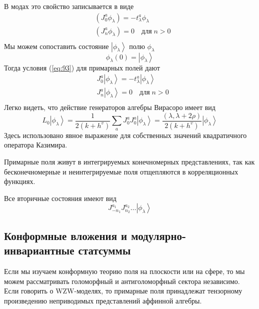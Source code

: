 \documentclass[a4paper,12pt]{article}
\theoremstyle{definition} \newtheorem{Def}{Definition}
\begin{document}
В модах это свойство записывается в виде
\begin{equation}
  \label{eq:93}
  \begin{aligned}
    & (J_0^a \phi_{\lambda})=-t^a_{\lambda}\phi_{\lambda}\\
    & (J^a_n\phi_{\lambda})=0\quad \mbox{для}\; n>0\\
  \end{aligned}
\end{equation}
Мы можем сопоставить состояние $\left|\phi_{\lambda}\right>$ полю $\phi_{\lambda}$
  \begin{equation}
    \label{eq:94}
    \phi_{\lambda}(0)=\left|\phi_{\lambda}\right>
  \end{equation}
Тогда условия (\ref{eq:93}) для примарных полей дают
\begin{equation}
  \label{eq:95}
  \begin{aligned}
    & J_0^a\left|\phi_{\lambda}\right>=-t^a_{\lambda}\left|\phi_{\lambda}\right>\\
    & J^a_n\left|\phi_{\lambda}\right>=0 \quad \mbox{для}\; n>0 \\
  \end{aligned}
\end{equation}
Легко видеть, что действие генераторов алгебры Вирасоро имеет вид
\begin{equation}
  \label{eq:96}
  L_0\left|\phi_{\lambda}\right>=\frac{1}{2(k+h^v)}\sum_aJ^a_0J^a_0\left|\phi_{\lambda}\right>=\frac{(\lambda,\lambda+2\rho)}{2(k+h^v)}\left|\phi_{\lambda}\right>
\end{equation}
Здесь использовано явное выражение для собственных значений квадратичного оператора Казимира.

Примарные поля живут в интегрируемых конечномерных представлениях, так как бесконечномерные и
неинтегрируемые поля отщепляются в корреляционных функциях.

Все вторичные состояния имеют вид
\begin{equation}
  \label{eq:97}
  J^{a_1}_{-n_1}J^{a_2}_{n_2}\dots\left|\phi_{\lambda}\right>
\end{equation}

\subsection{Конформные вложения и модулярно-инвариантные статсуммы}
\label{sec:modular-invariance}

Если мы изучаем конформную теорию поля на плоскости или на сфере, то мы можем рассматривать
голоморфный и антиголоморфный сектора независимо. Если говорить о WZW-моделях, то примарные поля
принадлежат тензорному произведению неприводимых представлений аффинной алгебры.
\end{document}
